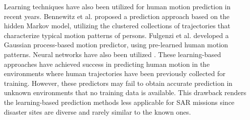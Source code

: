 \documentclass[letterpaper, 10 pt, conference]{ieeeconf}
\newcommand{\todohere}[1]{\hl{(\textbf{TODO:} #1)}}
\begin{document}
	Learning techniques have also been utilized for human motion prediction in recent years. 
	Bennewitz et al. \cite{bennewitz2005learning} proposed a prediction approach based on the hidden Markov model, utilizing the clustered collections of trajectories that characterize typical motion patterns of persons.
	Fulgenzi et al. \cite{fulgenzi2008probabilistic} developed a Gaussian process-based motion predictor, using pre-learned human motion patterns.
	Neural networks have also been utilized \cite{foka2010probabilistic,wu2012path}.
	These learning-based approaches have achieved success in predicting human motion in the environments where human trajectories have been previously collected for training.
	However, these predictors may fail to obtain accurate prediction in unknown environments that no training data is available.
	This drawback renders the learning-based prediction methods less applicable for SAR missions since disaster sites are diverse and rarely similar to the known ones.
	
\end{document}

